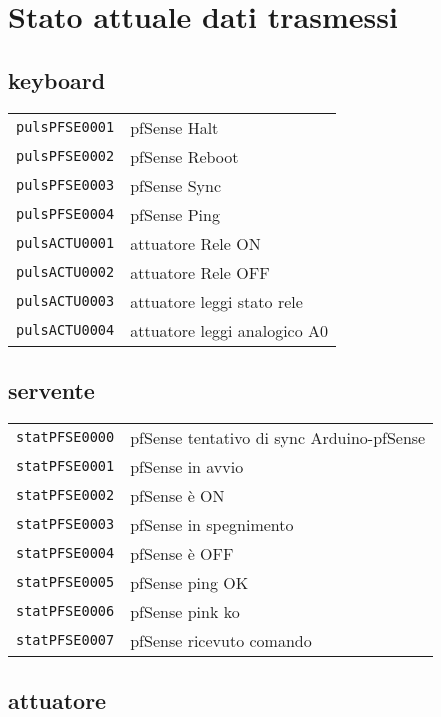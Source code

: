 \documentclass[italian]{article}
\begin{document}
	
    \section*{Stato attuale dati trasmessi}
    
    \subsection*{keyboard}
    \begin{tabular}{ll}
        \texttt{pulsPFSE0001} & pfSense Halt \\
        \texttt{pulsPFSE0002} & pfSense Reboot \\
        \texttt{pulsPFSE0003} & pfSense Sync \\
        \texttt{pulsPFSE0004} & pfSense Ping \\
        \texttt{pulsACTU0001} & attuatore Rele ON\\
        \texttt{pulsACTU0002} & attuatore Rele OFF\\
        \texttt{pulsACTU0003} & attuatore leggi stato rele\\
        \texttt{pulsACTU0004} & attuatore leggi analogico A0\\            
    \end{tabular}
    
    \subsection*{servente}
    
    \begin{tabular}{ll}
        \texttt{statPFSE0000} & pfSense tentativo di sync Arduino-pfSense\\
        \texttt{statPFSE0001} & pfSense in avvio\\
        \texttt{statPFSE0002} & pfSense è ON\\
        \texttt{statPFSE0003} & pfSense in spegnimento\\
        \texttt{statPFSE0004} & pfSense è OFF \\
        \texttt{statPFSE0005} & pfSense ping OK\\
        \texttt{statPFSE0006} & pfSense pink ko\\
        \texttt{statPFSE0007} & pfSense ricevuto comando\\        

    \end{tabular}
    
    \subsection*{attuatore}    
    
\end{document}

